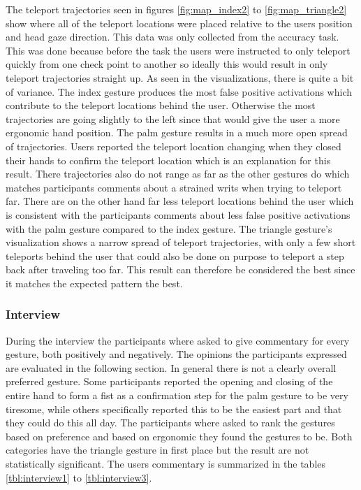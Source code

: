 The teleport trajectories seen in figures \ref{fig:map_index2} to \ref{fig:map_triangle2} show where all of the teleport locations were placed relative to the users position and head gaze direction. This data was only collected from the accuracy task. This was done because before the task the users were instructed to only teleport quickly from one check point to another so ideally this would result in only teleport trajectories straight up. As seen in the visualizations, there is quite a bit of variance. The index gesture produces the most false positive activations which contribute to the teleport locations behind the user. Otherwise the most trajectories are going slightly to the left since that would give the user a more ergonomic hand position. The palm gesture results in a much more open spread of trajectories. Users reported the teleport location changing when they closed their hands to confirm the teleport location which is an explanation for this result. There trajectories also do not range as far as the other gestures do which matches participants comments about a strained writs when trying to teleport far. There are on the other hand far less teleport locations behind the user which is consistent with the participants comments about less false positive activations with the palm gesture compared to the index gesture. The triangle gesture's visualization shows a narrow spread of teleport trajectories, with only a few short teleports behind the user that could also be done on purpose to teleport a step back after traveling too far. This result can therefore be considered the best since it matches the expected pattern the best. 

\subsubsection{Interview}
During the interview the participants where asked to give commentary for every gesture, both positively and negatively. The opinions the participants expressed are evaluated in the following section. In general there is not a clearly overall preferred gesture. Some participants reported the opening and closing of the entire hand to form a fist as a confirmation step for the palm gesture to be very tiresome, while others specifically reported this to be the easiest part and that they could do this all day. The participants where asked to rank the gestures based on preference and based on ergonomic they found the gestures to be. Both categories have the triangle gesture in first place but the result are not statistically significant. The users commentary is summarized in the tables \ref{tbl:interview1} to \ref{tbl:interview3}. 

